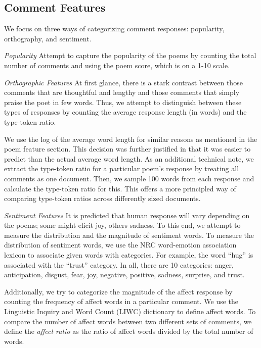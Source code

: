 \documentclass[11pt]{article}
\begin{document}
\subsection*{Comment Features}
We focus on three ways of categorizing comment responses: popularity, orthography, and sentiment.

\emph{Popularity}
Attempt to capture the popularity of the poems by counting the total number of comments and using the poem score, which is on a 1-10 scale.

\emph{Orthographic Features}
At first glance, there is a stark contrast between those comments that are thoughtful and lengthy and those comments that simply praise the poet in few words. Thus, we attempt to distinguish between these types of responses by counting the average response length (in words) and the type-token ratio. 

We use the log of the average word length for similar reasons as mentioned in the poem feature section. This decision was further justified in that it was easier to predict than the actual average word length. As an additional technical note, we extract the type-token ratio for a particular poem's response by treating all comments as one document. Then, we sample 100 words from each response and calculate the type-token ratio for this. This offers a more principled way of comparing type-token ratios across differently sized documents.

\emph{Sentiment Features}
It is predicted that human response will vary depending on the poems; some might elicit joy, others sadness. To this end, we attempt to measure the distribution and the magnitude of sentiment words. To measure the distribution of sentiment words, we use the NRC word-emotion association lexicon\cite{mohammad2010emotions} to associate given words with categories. For example, the word ``hug'' is associated with the ``trust'' category. In all, there are 10 categories: anger, anticipation, disgust, fear, joy, negative, positive, sadness, surprise, and trust.

Additionally, we try to categorize the magnitude of the affect response by counting the frequency of affect words in a particular comment. We use the Linguistic Inquiry and Word Count (LIWC) dictionary\cite{pennebaker2001linguistic} to define affect words. To compare the number of affect words between two different sets of comments, we define the \emph{affect ratio} as the ratio of affect words divided by the total number of words.
\end{document}
